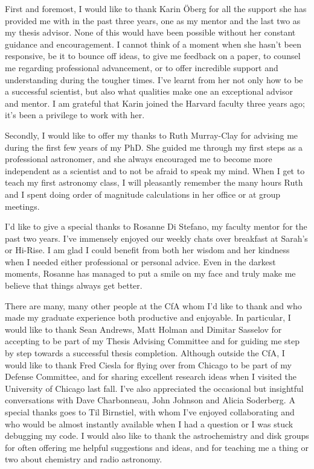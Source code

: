 
First and foremost, I would like to thank Karin \"Oberg for all the support she has provided me with in the past three years, one as my mentor and the last two as my thesis advisor. None of this would have been possible without her constant guidance and encouragement. I cannot think of a moment when she hasn't been responsive, be it to bounce off ideas, to give me feedback on a paper, to counsel me regarding professional advancement, or to offer incredible support and understanding during the tougher times. I've learnt from her not only how to be a successful scientist, but also what qualities make one an exceptional advisor and mentor. I am grateful that Karin joined the Harvard faculty three years ago; it's been a privilege to work with her. 

Secondly, I would like to offer my thanks to Ruth Murray-Clay for advising me during the first few years of my PhD. She guided me through my first steps as a professional astronomer, and she always encouraged me to become more independent as a scientist and to not be afraid to speak my mind. When I get to teach my first astronomy class, I will pleasantly remember the many hours Ruth and I spent doing order of magnitude calculations in her office or at group meetings.  

I'd like to give a special thanks to Rosanne Di Stefano, my faculty mentor for the past two years. I've immensely enjoyed our weekly chats over breakfast at Sarah's or Hi-Rise. I am glad I could benefit from both her wisdom and her kindness when I needed either professional or personal advice. Even in the darkest moments, Rosanne has managed to put a smile on my face and truly make me believe that things always get better.

There are many, many other people at the CfA whom I'd like to thank and who made my graduate experience both productive and enjoyable. In particular, I would like to thank Sean Andrews, Matt Holman and Dimitar Sasselov for accepting to be part of my Thesis Advising Committee and for guiding me step by step towards a successful thesis completion. Although outside the CfA, I would like to thank Fred Ciesla for flying over from Chicago to be part of my Defense Committee, and for sharing excellent research ideas when I visited the University of Chicago last fall. I've also appreciated the occasional but insightful conversations with Dave Charbonneau, John Johnson and Alicia Soderberg. A special thanks goes to Til Birnstiel, with whom I've enjoyed collaborating and who would be almost instantly available when I had a question or I was stuck debugging my code. I would also like to thank the astrochemistry and disk groups for often offering me helpful suggestions and ideas, and for teaching me a thing or two about chemistry and radio astronomy.

